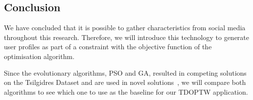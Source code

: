 \subsection{Conclusion}
We have concluded that it is possible to gather characteristics from social media throughout this
research. Therefore, we will introduce this technology to generate user
profiles as part of a constraint with the objective function of the
optimisation algorithm.

Since the evolutionary algorithms, PSO and GA, resulted in competing solutions
on the Tsilgidres Dataset and are used in novel solutions~\cite{Yu2019,
Wisittipanich2020}, we will compare both algorithms to see which one to use as
the baseline for our TDOPTW application.


